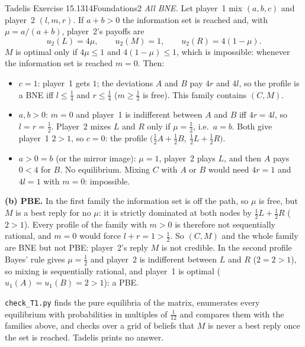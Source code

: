 \begin{exsol}{Tadelis Exercise 15.1}{314}{Foundations}{2}
\emph{All BNE.} Let player~1 mix $(a, b, c)$ and player~2 $(l, m, r)$. If $a + b > 0$ the
information set is reached and, with $\mu = a/(a+b)$, player~2's payoffs are
\[
  u_2(L) = 4\mu, \qquad u_2(M) = 1, \qquad u_2(R) = 4(1-\mu).
\]
$M$ is optimal only if $4\mu \le 1$ and $4(1-\mu) \le 1$, which is impossible: whenever the
information set is reached $m = 0$. Then:
\begin{itemize}
  \item $c = 1$: player~1 gets $1$; the deviations $A$ and $B$ pay $4r$ and $4l$, so the profile is a
  BNE iff $l \le \frac14$ and $r \le \frac14$ ($m \ge \frac12$ is free). This family contains $(C,M)$.
  \item $a, b > 0$: $m = 0$ and player~1 is indifferent between $A$ and $B$ iff $4r = 4l$, so
  $l = r = \frac12$. Player~2 mixes $L$ and $R$ only if $\mu = \frac12$, i.e.\ $a = b$. Both give
  player~1 $2 > 1$, so $c = 0$: the profile $\bigl(\frac12 A + \frac12 B,\ \frac12 L + \frac12 R\bigr)$.
  \item $a > 0 = b$ (or the mirror image): $\mu = 1$, player~2 plays $L$, and then $A$ pays $0 < 4$
  for $B$. No equilibrium. Mixing $C$ with $A$ or $B$ would need $4r = 1$ and $4l = 1$ with $m = 0$:
  impossible.
\end{itemize}
\textbf{(b) PBE.} In the first family the information set is off the path, so $\mu$ is free, but $M$
is a best reply for no $\mu$: it is strictly dominated at both nodes by $\frac12 L + \frac12 R$
($2 > 1$). Every profile of the family with $m > 0$ is therefore not sequentially rational, and
$m = 0$ would force $l + r = 1 > \frac12$. So $(C, M)$ and the whole family are BNE but not PBE:
player~2's reply $M$ is not credible. In the second profile Bayes' rule gives $\mu = \frac12$ and
player~2 is indifferent between $L$ and $R$ ($2 = 2 > 1$), so mixing is sequentially rational, and
player~1 is optimal ($u_1(A) = u_1(B) = 2 > 1$): a PBE.

\verify \texttt{check\_T1.py} finds the pure equilibria of the matrix, enumerates every
equilibrium with probabilities in multiples of $\frac1{12}$ and compares them with the families above,
and checks over a grid of beliefs that $M$ is never a best reply once the set is reached. Tadelis
prints no answer.

\end{exsol}

